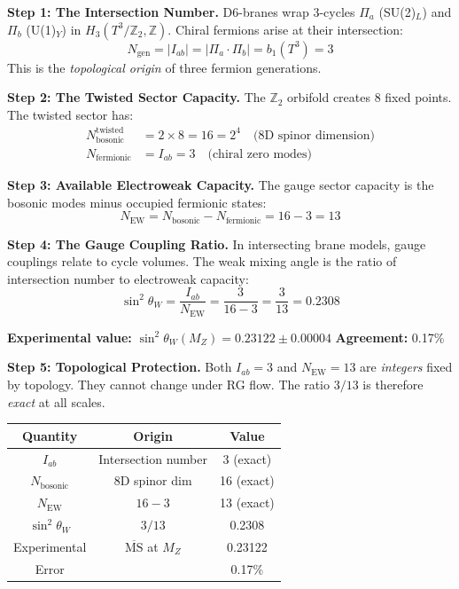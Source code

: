 \documentclass[12pt,a4paper]{article}
\newcommand{\Ztwo}{\mathbb{Z}_2}
\newcommand{\Tthree}{T^3}
\newcommand{\sinW}{\sin^2\theta_W}
\begin{document}
\textbf{Step 1: The Intersection Number.}
D6-branes wrap 3-cycles $\Pi_a$ (SU(2)$_L$) and $\Pi_b$ (U(1)$_Y$) in $H_3(\Tthree/\Ztwo, \mathbb{Z})$. Chiral fermions arise at their intersection:
\begin{equation}
N_{\text{gen}} = |I_{ab}| = |\Pi_a \cdot \Pi_b| = b_1(\Tthree) = 3
\end{equation}
This is the \textit{topological origin} of three fermion generations.

\textbf{Step 2: The Twisted Sector Capacity.}
The $\Ztwo$ orbifold creates 8 fixed points. The twisted sector has:
\begin{align}
N_{\text{bosonic}}^{\text{twisted}} &= 2 \times 8 = 16 = 2^4 \quad \text{(8D spinor dimension)} \\
N_{\text{fermionic}} &= I_{ab} = 3 \quad \text{(chiral zero modes)}
\end{align}

\textbf{Step 3: Available Electroweak Capacity.}
The gauge sector capacity is the bosonic modes minus occupied fermionic states:
\begin{equation}
N_{\text{EW}} = N_{\text{bosonic}} - N_{\text{fermionic}} = 16 - 3 = 13
\end{equation}

\textbf{Step 4: The Gauge Coupling Ratio.}
In intersecting brane models, gauge couplings relate to cycle volumes. The weak mixing angle is the ratio of intersection number to electroweak capacity:
\begin{equation}
\boxed{\sinW = \frac{I_{ab}}{N_{\text{EW}}} = \frac{3}{16 - 3} = \frac{3}{13} = 0.2308}
\end{equation}

\textbf{Experimental value:} $\sinW(M_Z) = 0.23122 \pm 0.00004$ \quad \textbf{Agreement:} 0.17\%

\textbf{Step 5: Topological Protection.}
Both $I_{ab} = 3$ and $N_{\text{EW}} = 13$ are \textit{integers} fixed by topology. They cannot change under RG flow. The ratio $3/13$ is therefore \textit{exact} at all scales.

\begin{center}
\begin{tabular}{|c|c|c|}
\hline
\textbf{Quantity} & \textbf{Origin} & \textbf{Value} \\
\hline
$I_{ab}$ & Intersection number & 3 (exact) \\
$N_{\text{bosonic}}$ & 8D spinor dim & 16 (exact) \\
$N_{\text{EW}}$ & $16 - 3$ & 13 (exact) \\
$\sinW$ & $3/13$ & 0.2308 \\
\hline
Experimental & $\overline{\text{MS}}$ at $M_Z$ & 0.23122 \\
Error & & 0.17\% \\
\hline
\end{tabular}
\end{center}
\end{document}

